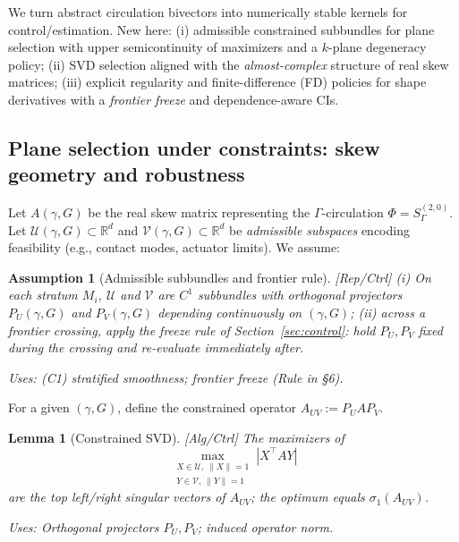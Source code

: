 \documentclass[10pt]{article}
\newcommand{\uses}[1]{\par\smallskip\noindent\textit{Uses: }#1\par\smallskip}
\newtheorem{assumption}{Assumption}
\newtheorem{lemma}{Lemma}
\begin{document}
We turn abstract circulation bivectors into numerically stable kernels for control/estimation. New here:
(i) admissible constrained subbundles for plane selection with upper semicontinuity of maximizers and a $k$-plane degeneracy policy; 
(ii) SVD selection aligned with the \emph{almost-complex} structure of real skew matrices; 
(iii) explicit regularity and finite-difference (FD) policies for shape derivatives with a \emph{frontier freeze} and dependence-aware CIs.

\setcounter{lemma}{10}
\setcounter{proposition}{1}

\subsection{Plane selection under constraints: skew geometry and robustness}\label{subsec:plane}

Let $A(\gamma,G)$ be the real skew matrix representing the $\Gamma$-circulation $\Phi=S^{(2,0)}_\Gamma$. 
Let $\mathcal U(\gamma,G)\subset \mathbb R^d$ and $\mathcal V(\gamma,G)\subset \mathbb R^d$ be \emph{admissible subspaces} encoding feasibility (e.g., contact modes, actuator limits). 
We assume:

\begin{assumption}[Admissible subbundles and frontier rule]\label{ass:admissible}
\emph{[\textup{Rep/Ctrl}]}
(i) On each stratum $M_i$, $\mathcal U$ and $\mathcal V$ are $C^1$ subbundles with orthogonal projectors $P_U(\gamma,G)$ and $P_V(\gamma,G)$ depending continuously on $(\gamma,G)$; 
(ii) across a frontier crossing, apply the \emph{freeze} rule of Section~\ref{sec:control}: hold $P_U,P_V$ fixed during the crossing and re-evaluate immediately after.
\uses{(C1) stratified smoothness; frontier freeze (Rule in §6).}
\end{assumption}

For a given $(\gamma,G)$, define the constrained operator $A_{UV}:=P_U A P_V$.

\begin{lemma}[Constrained SVD]\label{lem:constrained-svd-7}
\emph{[\textup{Alg/Ctrl}]}
The maximizers of 
\[
\max_{\substack{X\in\mathcal U,\ \|X\|=1\\ Y\in\mathcal V,\ \|Y\|=1}} |X^\top A Y|
\]
are the top left/right singular vectors of $A_{UV}$; the optimum equals $\sigma_1(A_{UV})$.
\uses{Orthogonal projectors $P_U,P_V$; induced operator norm.}
\end{lemma}
\end{document}
